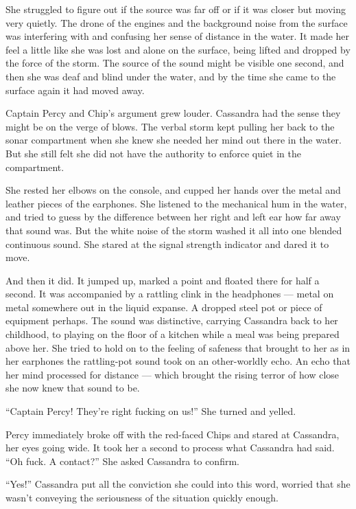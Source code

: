 \documentclass[]{scrbook}
\begin{document}
She struggled to figure out if the source was far off or if it was
closer but moving very quietly. The drone of the engines and the
background noise from the surface was interfering with and confusing her
sense of distance in the water. It made her feel a little like she was
lost and alone on the surface, being lifted and dropped by the force of
the storm. The source of the sound might be visible one second, and then
she was deaf and blind under the water, and by the time she came to the
surface again it had moved away.

Captain Percy and Chip's argument grew louder. Cassandra had the sense
they might be on the verge of blows. The verbal storm kept pulling her
back to the sonar compartment when she knew she needed her mind out
there in the water. But she still felt she did not have the authority to
enforce quiet in the compartment.

She rested her elbows on the console, and cupped her hands over the
metal and leather pieces of the earphones. She listened to the
mechanical hum in the water, and tried to guess by the difference
between her right and left ear how far away that sound was. But the
white noise of the storm washed it all into one blended continuous
sound. She stared at the signal strength indicator and dared it to move.

And then it did. It jumped up, marked a point and floated there for half
a second. It was accompanied by a rattling clink in the headphones ---
metal on metal somewhere out in the liquid expanse. A dropped steel pot
or piece of equipment perhaps. The sound was distinctive, carrying
Cassandra back to her childhood, to playing on the floor of a kitchen
while a meal was being prepared above her. She tried to hold on to the
feeling of safeness that brought to her as in her earphones the
rattling-pot sound took on an other-worldly echo. An echo that her mind
processed for distance --- which brought the rising terror of how close
she now knew that sound to be.

``Captain Percy! They're right fucking on us!'' She turned and yelled.

Percy immediately broke off with the red-faced Chips and stared at
Cassandra, her eyes going wide. It took her a second to process what
Cassandra had said. ``Oh fuck. A contact?'' She asked Cassandra to
confirm.

``Yes!'' Cassandra put all the conviction she could into this word,
worried that she wasn't conveying the seriousness of the situation
quickly enough.
\end{document}

